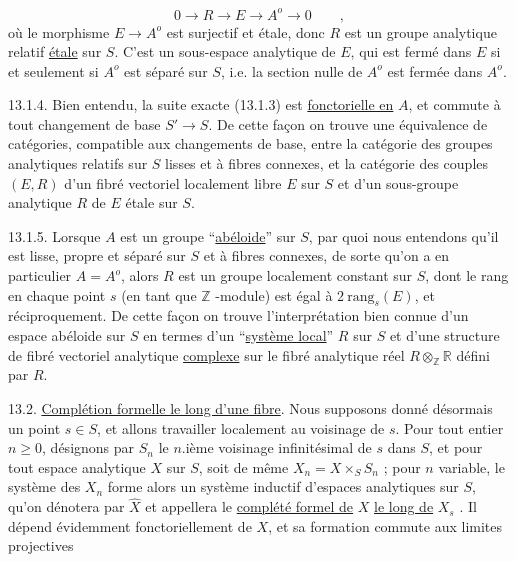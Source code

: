 \begin{equation}\tag{13.1.3}
0 \longrightarrow R \longrightarrow E \longrightarrow A^{o} \longrightarrow 0 \qquad ,
\end{equation}
où le morphisme $E \longrightarrow A^{o}$ est surjectif et étale, donc $R$ est un groupe analytique relatif \underline{étale} sur $S$. C'est un sous-espace analytique de $E$, qui est fermé dans $E$ si et seulement si $A^{o}$ est séparé sur $S$, i.e. la section nulle de $A^{o}$ est fermée dans $A^{o}$.



13.1.4. Bien entendu, la suite exacte (13.1.3) est \underline{fonctorielle en} $A$, et commute à tout changement de base $S' \longrightarrow S$. De cette façon on trouve une équivalence de catégories, compatible aux changements de base, entre la catégorie des groupes analytiques relatifs sur $S$ lisses et à fibres connexes, et la catégorie des couples $(E,R)$ d'un fibré vectoriel localement libre $E$ sur $S$ et d'un sous-groupe analytique $R$ de $E$ étale sur $S$.

13.1.5. Lorsque $A$ est un groupe ``\underline{abéloide}'' sur $S$, par quoi nous entendons qu'il est lisse, propre et séparé sur $S$ et à fibres connexes, de sorte qu'on a en particulier $A=A^{o}$, alors $R$ est un groupe localement constant sur $S$, dont le rang en chaque point $s$ (en tant que $\mathbb{Z}$ -module) est égal à $2\ \mathrm{rang}_s(E)$, et réciproquement. De cette façon on trouve l'interprétation bien connue d'un espace abéloide sur $S$ en termes d'un ``\underline{système local}'' $R$ sur $S$ et d'une structure de fibré vectoriel analytique \underline{complexe} sur le fibré analytique réel $R \otimes_{\mathbb{Z}} \mathbb{R}$ défini par $R$.

13.2. \underline{Complétion formelle le long d'une fibre}. Nous supposons donné désormais un point $s \in S$, et allons travailler localement au voisinage de $s$. Pour tout entier $n \geq 0$, désignons par $S_n$ le $n$.ième voisinage infinitésimal de $s$ dans $S$, et pour tout espace analytique $X$ sur $S$, soit de même $X_n=X\times_S S_n$ ; pour $n$ variable, le système des $X_n$ forme alors un système inductif d'espaces analytiques sur $S$, qu'on dénotera par $\hat{X}$ et appellera le \underline{complété formel de} $X$ \underline{le long de} $X_s$ . Il dépend évidemment fonctoriellement de $X$, et sa formation commute aux limites projectives



